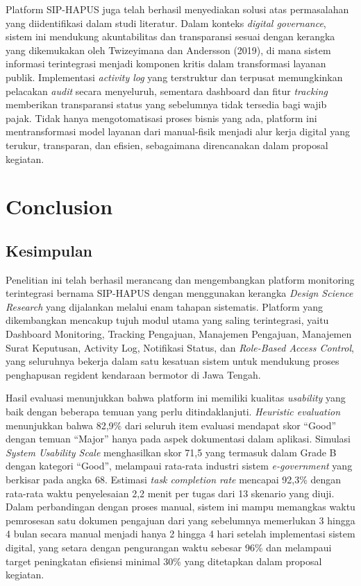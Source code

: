 \documentclass[conference]{IEEEtran}
\begin{document}
Platform SIP-HAPUS juga telah berhasil menyediakan solusi atas permasalahan yang
diidentifikasi dalam studi literatur. Dalam konteks \emph{digital governance}, sistem
ini mendukung akuntabilitas dan transparansi sesuai dengan kerangka yang dikemukakan
oleh Twizeyimana dan Andersson (2019), di mana sistem informasi terintegrasi menjadi
komponen kritis dalam transformasi layanan publik. Implementasi \emph{activity log}
yang terstruktur dan terpusat memungkinkan pelacakan \emph{audit} secara menyeluruh,
sementara dashboard dan fitur \emph{tracking} memberikan transparansi status yang
sebelumnya tidak tersedia bagi wajib pajak. Tidak hanya mengotomatisasi proses bisnis
yang ada, platform ini mentransformasi model layanan dari manual-fisik menjadi alur kerja
digital yang terukur, transparan, dan efisien, sebagaimana direncanakan dalam proposal
kegiatan.

\section{Conclusion}
\label{sec:conclusion}

\subsection{Kesimpulan}
\label{subsec:kesimpulan}

Penelitian ini telah berhasil merancang dan mengembangkan platform monitoring terintegrasi
bernama SIP-HAPUS dengan menggunakan kerangka \emph{Design Science Research} yang
dijalankan melalui enam tahapan sistematis. Platform yang dikembangkan mencakup tujuh
modul utama yang saling terintegrasi, yaitu Dashboard Monitoring, Tracking Pengajuan,
Manajemen Pengajuan, Manajemen Surat Keputusan, Activity Log, Notifikasi Status, dan
\emph{Role-Based Access Control}, yang seluruhnya bekerja dalam satu kesatuan sistem
untuk mendukung proses penghapusan regident kendaraan bermotor di Jawa Tengah.

Hasil evaluasi menunjukkan bahwa platform ini memiliki kualitas \emph{usability} yang baik
dengan beberapa temuan yang perlu ditindaklanjuti. \emph{Heuristic evaluation} menunjukkan
bahwa 82,9\% dari seluruh item evaluasi mendapat skor ``Good'' dengan temuan ``Major''
hanya pada aspek dokumentasi dalam aplikasi. Simulasi \emph{System Usability Scale}
menghasilkan skor 71,5 yang termasuk dalam Grade B dengan kategori ``Good'', melampaui
rata-rata industri sistem \emph{e-government} yang berkisar pada angka 68. Estimasi
\emph{task completion rate} mencapai 92,3\% dengan rata-rata waktu penyelesaian 2,2 menit
per tugas dari 13 skenario yang diuji. Dalam perbandingan dengan proses manual, sistem ini
mampu memangkas waktu pemrosesan satu dokumen pengajuan dari yang sebelumnya memerlukan
3 hingga 4 bulan secara manual menjadi hanya 2 hingga 4 hari setelah implementasi sistem
digital, yang setara dengan pengurangan waktu sebesar 96\% dan melampaui target peningkatan
efisiensi minimal 30\% yang ditetapkan dalam proposal kegiatan.
\end{document}
